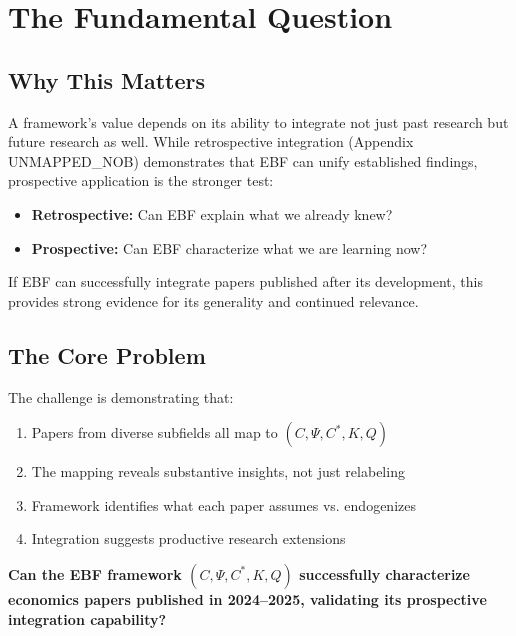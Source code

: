 \section{The Fundamental Question}
\label{sec:J-fundamental}

\subsection{Why This Matters}

A framework's value depends on its ability to integrate not just past research
but future research as well. While retrospective integration (Appendix UNMAPPED_NOB)
demonstrates that EBF can unify established findings, prospective application
is the stronger test:

\begin{itemize}
    \item \textbf{Retrospective:} Can EBF explain what we already knew?
    \item \textbf{Prospective:} Can EBF characterize what we are learning now?
\end{itemize}

If EBF can successfully integrate papers published after its development,
this provides strong evidence for its generality and continued relevance.

\subsection{The Core Problem}

The challenge is demonstrating that:
\begin{enumerate}
    \item Papers from diverse subfields all map to $(C, \Psi, C^*, K, Q)$
    \item The mapping reveals substantive insights, not just relabeling
    \item Framework identifies what each paper assumes vs. endogenizes
    \item Integration suggests productive research extensions
\end{enumerate}

\begin{tcolorbox}[colback=red!5!white, colframe=red!75!black,
    title=The Fundamental Question]
\textbf{Can the EBF framework $(C, \Psi, C^*, K, Q)$ successfully characterize
economics papers published in 2024--2025, validating its prospective
integration capability?}
\end{tcolorbox}


